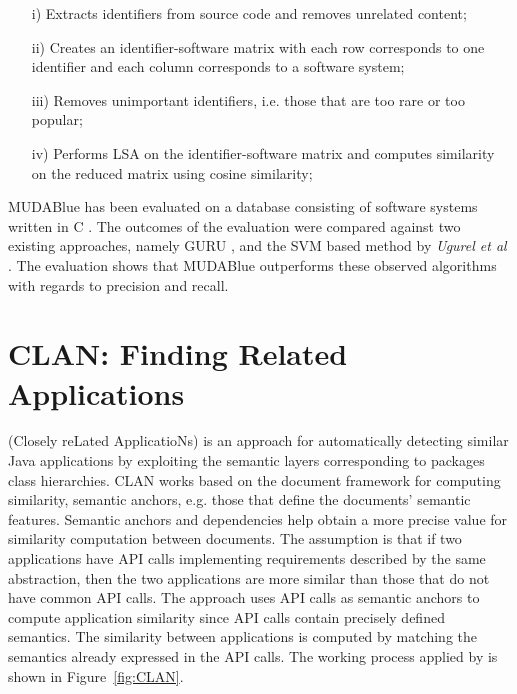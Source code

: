 \begin{itemize}
	
	\item[i)] Extracts identifiers from source code and removes unrelated content;
	\item[ii)] Creates an identifier-software matrix with each row corresponds to one identifier and each column corresponds to a software system;%
	\item[iii)] Removes unimportant identifiers, i.e. those that are too rare or too popular;
	\item[iv)] Performs LSA on the identifier-software matrix and computes similarity on the reduced matrix using cosine similarity; 
\end{itemize}



MUDABlue has been evaluated on a database consisting of software systems written in C \cite{10.1109/APSEC.2004.69}. The outcomes of the evaluation were compared against two existing approaches, namely GURU \cite{Maarek:1991:IRA:126244.126254}, and the SVM based method by \emph{Ugurel et al} \cite{Ugurel:2002:WCA:775047.775141}. The evaluation shows that MUDABlue outperforms these observed algorithms with regards to precision and recall.


\section{CLAN: Finding Related Applications}\label{sec:clan}

\CLAN (Closely reLated ApplicatioNs) \cite{McMillan:2012:DSS:2337223.2337267} is an approach for automatically detecting similar Java applications by exploiting the semantic layers corresponding to packages class hierarchies. CLAN works based on the document framework for computing similarity, semantic anchors, e.g. those that define the documents' semantic features. Semantic anchors and dependencies help obtain a more precise value for similarity computation between documents. The assumption is that if two applications have API calls implementing requirements described by the same abstraction, then the two applications are more similar than those that do not have common API calls. The approach uses API calls as semantic anchors to compute application similarity since API calls contain precisely defined semantics. The similarity between applications is computed by matching the semantics already expressed in the API calls. The working process applied by \CLAN is shown in Figure~\ref{fig:CLAN}.

